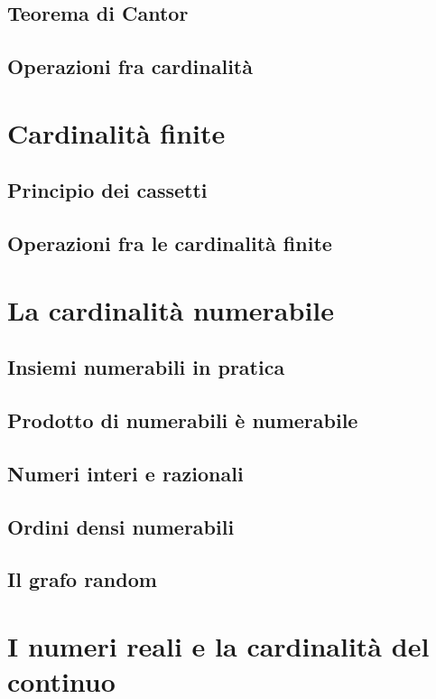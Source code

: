 \documentclass[11pt]{scrartcl}
\begin{document}
\subsection{Teorema di Cantor}
\newpage
\subsection{Operazioni fra cardinalità}





\newpage
\section{Cardinalità finite}
\subsection{Principio dei cassetti}
\newpage
\subsection{Operazioni fra le cardinalità finite}




\newpage
\section{La cardinalità numerabile}
\subsection{Insiemi numerabili in pratica}
\newpage
\subsection{Prodotto di numerabili è numerabile}
\newpage
\subsection{Numeri interi e razionali}
\newpage
\subsection{Ordini densi numerabili}
\newpage
\subsection{Il grafo random}




\newpage
\section{I numeri reali e la cardinalità del continuo}
\end{document}
